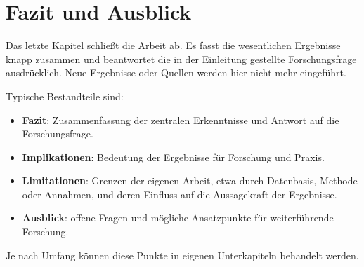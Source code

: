 \chapter{Fazit und Ausblick}

Das letzte Kapitel schließt die Arbeit ab. Es fasst die wesentlichen Ergebnisse knapp zusammen und beantwortet die in der Einleitung gestellte Forschungsfrage ausdrücklich. Neue Ergebnisse oder Quellen werden hier nicht mehr eingeführt.

Typische Bestandteile sind:
\begin{itemize}
    \item \textbf{Fazit}: Zusammenfassung der zentralen Erkenntnisse und Antwort auf die Forschungsfrage.
    \item \textbf{Implikationen}: Bedeutung der Ergebnisse für Forschung und Praxis.
    \item \textbf{Limitationen}: Grenzen der eigenen Arbeit, etwa durch Datenbasis, Methode oder Annahmen, und deren Einfluss auf die Aussagekraft der Ergebnisse.
    \item \textbf{Ausblick}: offene Fragen und mögliche Ansatzpunkte für weiterführende Forschung.
\end{itemize}
Je nach Umfang können diese Punkte in eigenen Unterkapiteln behandelt werden.
